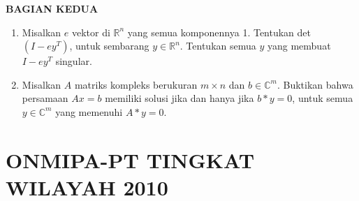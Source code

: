 \documentclass[12pt,twoside]{article}
\begin{document}
\newpage \textbf{BAGIAN KEDUA}
\begin{enumerate}
	\item Misalkan $e$ vektor di $\mathbb{R}^n$ yang semua komponennya 1. Tentukan det$(I-ey^T)$, untuk sembarang $y \in \mathbb{R}^n$. Tentukan semua $y$ yang membuat $I-ey^T$ singular.

	\item Misalkan $A$ matriks kompleks berukuran $m \times n$ dan $b \in \mathbb{C}^m$. Buktikan bahwa persamaan $Ax = b$ memiliki solusi jika dan hanya jika $b*y = 0$, untuk semua $y \in \mathbb{C}^m$ yang memenuhi $A*y = 0$.
\end{enumerate}
\newpage

\section{ONMIPA-PT TINGKAT WILAYAH 2010}
\end{document}
